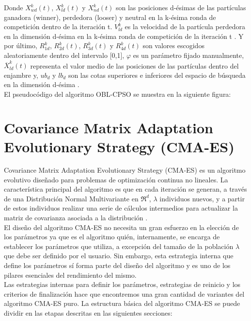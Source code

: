 Donde $X^{k}_{wd}(t)$, $ X^{k}_{ld}(t)$ y $ X^{k}_{nd}(t)$ son las posiciones d-ésimas de las partículas ganadora (winner), perdedora (looser) y neutral en la k-ésima ronda de competición dentro de la iteración t. $V^{k}_{ld}$ es la velocidad de la partícula perdedora en la dimensión d-ésima en la k-ésima ronda de competición de la iteración t \cite{oblcpso}. Y por último, $R^{k}_{1d}$, $R^{k}_{2d}(t)$, $R^{k}_{3d}(t)$ y $R^{k}_{4d}(t)$ son valores escogidos aleatoriamente dentro del intervalo [0,1], $\varphi$ es un parámetro fijado manualmente, $\overline{X}^{k}_{ld}(t)$ representa el valor medio de las posiciones de las partículas dentro del enjambre y, $ub_{d}$ y $lb_{d}$ son las cotas superiores e inferiores del espacio de búsqueda en la dimensión d-ésima \cite{oblcpso}. \\
El pseudocódigo del algoritmo OBL-CPSO se muestra en la siguiente figura: 



\section{Covariance Matrix Adaptation Evolutionary Strategy (CMA-ES)}
\label{sec:CMA}

Covariance Matrix Adaptation Evolutionary Strategy (CMA-ES) \cite{CMA1, CMA2, CMA} es un algoritmo evolutivo diseñado para problemas de optimización continua no lineales. 
La característica principal del algoritmo es que en cada iteración se generan, a través de una Distribución Normal Multivariante en $\Re^{d}$, $\lambda$ individuos nuevos, y a partir de estos individuos realizar una serie de cálculos intermedios para actualizar la matriz de covarianza asociada a la distribución \cite{CMA1}. \\  
El diseño del algoritmo CMA-ES no necesita un gran esfuerzo en la elección de los parámetros ya que es el algoritmo quién, internamente, se encarga de establecer los parámetros que utiliza, a excepción del tamaño de la población $\lambda$ que debe ser definido por el usuario. Sin embargo, esta estrategia interna que define los parámetros sí forma parte del diseño del algoritmo y es uno de los pilares esenciales del rendimiento del mismo. \\

Las estrategias internas para definir los parámetros, estrategias de reinicio y los criterios de finalización hace que encontremos una gran cantidad de variantes del algoritmo CMA-ES puro. La estructura básica del algoritmo CMA-ES se puede dividir en las etapas descritas en las siguientes secciones: \\ 

